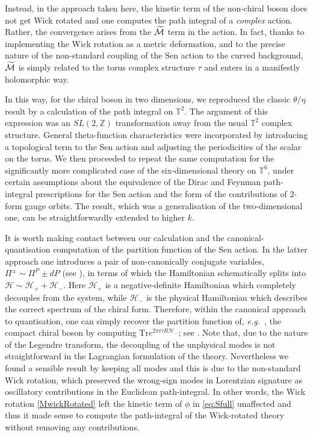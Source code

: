 \documentclass[11pt]{article}
\numberwithin{equation}{section}
\begin{document}
Instead, in the approach taken here, the kinetic term of the non-chiral boson does not get Wick rotated and one computes the path integral of a \textit{complex} action. Rather, the convergence arises from the $ \widetilde {\cal M} $ term in the action.  
In fact,  thanks to implementing the Wick rotation as a metric deformation, and to the precise nature of the non-standard coupling of the Sen action to the curved background, $\widetilde {\cal M}$ is simply related to the torus complex structure  $\tau$  and enters in a manifestly holomorphic way. 

In this way, for  the chiral boson in two dimensions, we  reproduced the classic $\theta/\eta$ result by a  calculation of the path integral on $\mathbb T^2$. The argument of this expression was an $SL(2,\mathbb Z)$ transformation away from the usual $\mathbb T^2$ complex structure. General theta-function characteristics were incorporated by introducing a topological term to the Sen action and adjusting the periodicities of the scalar on the torus. We then proceeded to repeat the same computation for the significantly more complicated case of the six-dimensional theory on $\mathbb T^6$, under certain assumptions about the equivalence of the Dirac and Feynman path-integral prescriptions for the Sen action and the form of the contributions of 2-form gauge orbits. The result, which was a generalisation of the two-dimensional one, can be straightforwardly extended to higher $k$. 

It is worth making contact between our calculation and the canonical-quantisation computation of the partition function of the Sen action. In the latter approach one introduces a pair of non-canonically conjugate variables, $\Pi^{\pm}\sim \Pi^{P}\pm dP$  (see \cite{Andriolo:2020ykk,Sen:2019qit}), in terms of which the Hamiltonian  schematically splits into $\mathcal{H}\sim \mathcal{H}_++\mathcal{H}_-$. Here $\mathcal{H}_+$ is a negative-definite Hamiltonian which completely decouples from the system, while $\mathcal{H}_-$ is the physical Hamiltonian which describes the correct spectrum of the chiral form. Therefore, within the canonical approach to quantisation, one can simply recover the partition function of, {\it e.g.}~, the compact chiral boson by computing $\text{Tr}e^{2\pi i \tau R \mathcal{H}_-}$; see \cite{Sen:2019qit}. Note that, due to the nature of the Legendre transform, the decoupling of the unphysical modes is not straightforward in the Lagrangian formulation of the theory. Nevertheless we  found a sensible result by keeping all modes and this is due to the non-standard Wick rotation, which preserved the wrong-sign modes in Lorentzian signature as oscillatory contributions in the Euclidean path-integral. In other words,  the Wick rotation \eqref{MwickRotated} left the kinetic term of $\phi$ in  \eqref{eq:Sfull} unaffected and thus it made sense to compute the path-integral of the Wick-rotated theory without removing any contributions.
\end{document}
